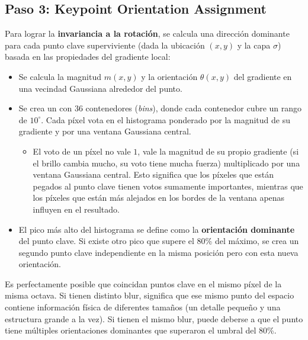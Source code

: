 \subsection{Paso 3: Keypoint Orientation Assignment}
\noindent
Para lograr la \textbf{invariancia a la rotación}, se calcula una dirección dominante para cada punto clave superviviente (dada la ubicación $(x,y)$ y la capa $\sigma$) basada en las propiedades del gradiente local:
\begin{itemize}
    \item Se calcula la magnitud $m(x,y)$ y la orientación $\theta(x,y)$ del gradiente en una vecindad Gaussiana alrededor del punto.
    \item Se crea un  con 36 contenedores (\textit{bins}), donde cada contenedor cubre un rango de $10^\circ$. Cada píxel vota en el histograma ponderado por la magnitud de su gradiente y por una ventana Gaussiana central.
    \begin{itemize}
        \item El voto de un píxel no vale $1$, vale la magnitud de su propio gradiente (si el brillo cambia mucho, su voto tiene mucha fuerza) multiplicado por una ventana Gaussiana central. Esto significa que los píxeles que están pegados al punto clave tienen votos sumamente importantes, mientras que los píxeles que están más alejados en los bordes de la ventana apenas influyen en el resultado.
    \end{itemize}
    \item El pico más alto del histograma se define como la \textbf{orientación dominante} del punto clave. Si existe otro pico que supere el 80\% del máximo, se crea un segundo punto clave independiente en la misma posición pero con esta nueva orientación.
\end{itemize}

\begin{observacion}
    Es perfectamente posible que coincidan puntos clave en el mismo píxel de la misma octava. Si tienen distinto blur, significa que ese mismo punto del espacio contiene información física de diferentes tamaños (un detalle pequeño y una estructura grande a la vez). Si tienen el mismo blur, puede deberse a que el punto tiene múltiples orientaciones dominantes que superaron el umbral del 80\%.
\end{observacion}

